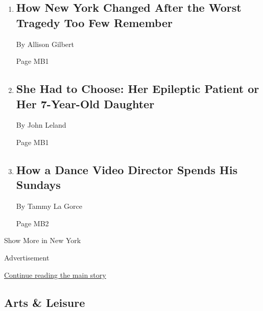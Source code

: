 \begin{enumerate}
\def\labelenumi{\arabic{enumi}.}
\item
  \href{/2020/03/25/nyregion/happy-land-fire-bronx.html}{}

  \hypertarget{how-new-york-changed-after-the-worst-tragedy-too-few-remember}{%
  \subsection{How New York Changed After the Worst Tragedy Too Few
  Remember}\label{how-new-york-changed-after-the-worst-tragedy-too-few-remember}}

  By Allison Gilbert

  Page MB1
\item
  \href{/2020/03/22/nyregion/coronavirus-caregivers-nyc.html}{}

  \hypertarget{she-had-to-choose-her-epileptic-patient-or-her-7-year-old-daughter}{%
  \subsection{She Had to Choose: Her Epileptic Patient or Her 7-Year-Old
  Daughter}\label{she-had-to-choose-her-epileptic-patient-or-her-7-year-old-daughter}}

  By John Leland

  Page MB1
\item
  \href{/2020/03/27/nyregion/redha-medjellekh.html}{}

  \hypertarget{how-a-dance-video-director-spends-his-sundays}{%
  \subsection{How a Dance Video Director Spends His
  Sundays}\label{how-a-dance-video-director-spends-his-sundays}}

  By Tammy La Gorce

  Page MB2
\end{enumerate}

Show More in New York

Advertisement

\protect\hyperlink{after-mid3}{Continue reading the main story}

\hypertarget{arts--leisure}{%
\subsection{Arts \& Leisure}\label{arts--leisure}}

